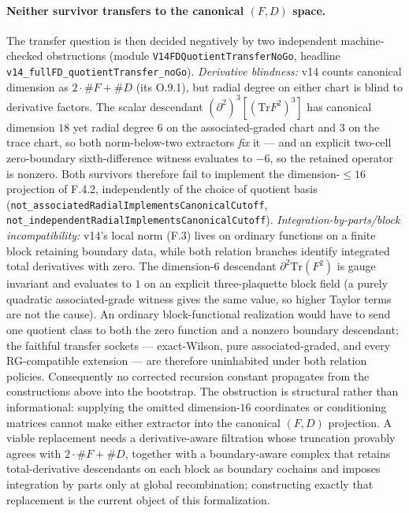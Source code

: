 \documentclass[11pt]{article}
\theoremstyle{definition}
\newcommand{\Tr}{\mathrm{Tr}}
\begin{document}
\paragraph{Neither survivor transfers to the canonical $(F,D)$ space.}
The transfer question is then decided negatively by two independent
machine-checked obstructions (module \texttt{V14FDQuotientTransferNoGo},
headline \texttt{v14\_fullFD\_quotientTransfer\_noGo}). \emph{Derivative
blindness:} v14 counts canonical dimension as $2\cdot\#F+\#D$ (its O.9.1),
but radial degree on either chart is blind to derivative factors. The scalar
descendant $(\partial^2)^3[(\Tr F^2)^3]$ has canonical dimension $18$ yet
radial degree $6$ on the associated-graded chart and $3$ on the trace chart,
so both norm-below-two extractors \emph{fix} it --- and an explicit two-cell
zero-boundary sixth-difference witness evaluates to $-6$, so the retained
operator is nonzero. Both survivors therefore fail to implement the
dimension-$\leq16$ projection of F.4.2, independently of the choice of
quotient basis (\texttt{not\_associatedRadialImplementsCanonicalCutoff},
\texttt{not\_independentRadialImplementsCanonicalCutoff}).
\emph{Integration-by-parts/block incompatibility:} v14's local norm (F.3)
lives on ordinary functions on a finite block retaining boundary data, while
both relation branches identify integrated total derivatives with zero. The
dimension-$6$ descendant $\partial^2\Tr(F^2)$ is gauge invariant and
evaluates to $1$ on an explicit three-plaquette block field (a purely
quadratic associated-grade witness gives the same value, so higher Taylor
terms are not the cause). An ordinary block-functional realization would have
to send one quotient class to both the zero function and a nonzero boundary
descendant; the faithful transfer sockets --- exact-Wilson, pure
associated-graded, and every RG-compatible extension --- are therefore
uninhabited under both relation policies. Consequently no corrected recursion
constant propagates from the constructions above into the bootstrap. The
obstruction is structural rather than informational: supplying the omitted
dimension-$16$ coordinates or conditioning matrices cannot make either
extractor into the canonical $(F,D)$ projection. A viable replacement needs a
derivative-aware filtration whose truncation provably agrees with
$2\cdot\#F+\#D$, together with a boundary-aware complex that retains
total-derivative descendants on each block as boundary cochains and imposes
integration by parts only at global recombination; constructing exactly that
replacement is the current object of this formalization.
\end{document}
